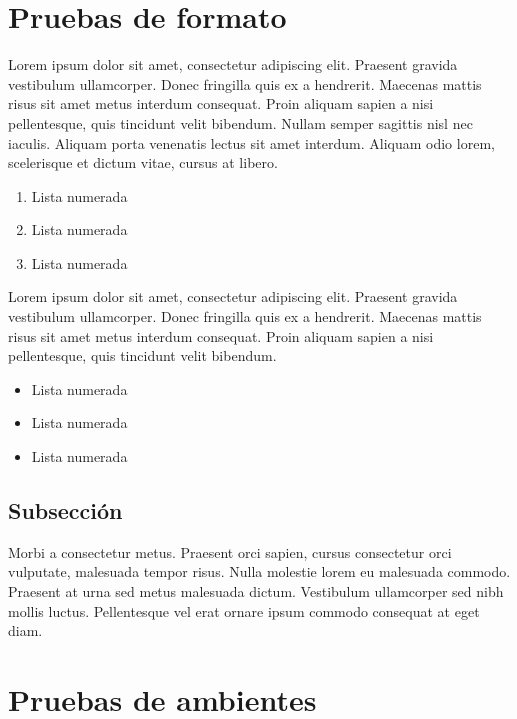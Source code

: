 \documentclass[a4]{aleph-notas}
\begin{document}
\encabezado

\section{Pruebas de formato}

Lorem ipsum dolor sit amet, consectetur adipiscing elit. Praesent gravida vestibulum ullamcorper. Donec fringilla quis ex a hendrerit. Maecenas mattis risus sit amet metus interdum consequat. Proin aliquam sapien a nisi pellentesque, quis tincidunt velit bibendum. Nullam semper sagittis nisl nec iaculis. Aliquam porta venenatis lectus sit amet interdum. Aliquam odio lorem, scelerisque et dictum vitae, cursus at libero. 
\begin{enumerate}
    \item Lista numerada
    \item Lista numerada
    \item Lista numerada
\end{enumerate}

Lorem ipsum dolor sit amet, consectetur adipiscing elit. Praesent gravida vestibulum ullamcorper. Donec fringilla quis ex a hendrerit. Maecenas mattis risus sit amet metus interdum consequat. Proin aliquam sapien a nisi pellentesque, quis tincidunt velit bibendum.
\begin{itemize}
    \item Lista numerada
    \item Lista numerada
    \item Lista numerada
\end{itemize}

\subsection{Subsección}

Morbi a consectetur metus. Praesent orci sapien, cursus consectetur orci vulputate, malesuada tempor risus. Nulla molestie lorem eu malesuada commodo. Praesent at urna sed metus malesuada dictum. Vestibulum ullamcorper sed nibh mollis luctus. Pellentesque vel erat ornare ipsum commodo consequat at eget diam. 

\section{Pruebas de ambientes}
\end{document}
